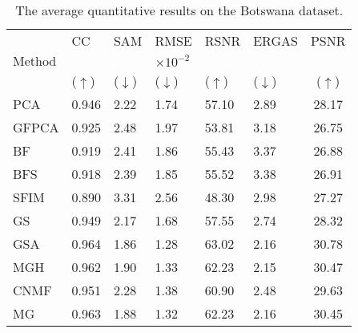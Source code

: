 \documentclass[journal]{IEEEtran}
\begin{document}
\begin{table}[tb]

        \centering
        \caption{The average quantitative results on the Botswana dataset.}
        \begin{tabular}{lp{0.5cm}p{0.5cm}p{0.6cm}p{0.5cm}p{0.6cm}c}
        \hline
        \multirow{3}{*}{Method}                          & CC                & SAM               & RMSE                  & RSNR              & ERGAS             & PSNR  \\
                                        &                   &                   &  $\times 10^{-2}$     &                   &                   & \\
                                        & ($\uparrow$)      & ($\downarrow$)    &  ($\downarrow$)       & ($\uparrow$)      & ($\downarrow$)    & ($\uparrow$)\\
        \hline
        PCA\cite{PCA1}                  & 0.946            & 2.22            & 1.74            & 57.10           & 2.89            & 28.17\\
        GFPCA \cite{GFPCA}              & 0.925            & 2.48            & 1.97            & 53.81           & 3.18            & 26.75\\
        BF \cite{BF}                    & 0.919            & 2.41            & 1.86            & 55.43           & 3.37            & 26.88\\
        BFS \cite{BFS}                  & 0.918            & 2.39            & 1.85            & 55.52           & 3.38            & 26.91\\
        SFIM \cite{SFIM}                & 0.890            & 3.31            & 2.56            & 48.30           & 2.98            & 27.27\\
        GS\cite{GS}                     & 0.949            & 2.17            & 1.68            & 57.55           & 2.74            & 28.32\\
        GSA\cite{GS}                    & 0.964            & 1.86            & 1.28            & 63.02           & 2.16            & 30.78\\
        MGH \cite{MTF-GLP-HPM}          & 0.962            & 1.90            & 1.33            & 62.23           & 2.15            & 30.47\\
        CNMF \cite{CNMF}                & 0.951            & 2.28            & 1.38            & 60.90           & 2.48            & 29.63\\
        MG \cite{MTF-GLP}               & 0.963            & 1.88            & 1.32            & 62.23           & 2.16            & 30.45\\

\end{tabular}
\end{table}
\end{document}
